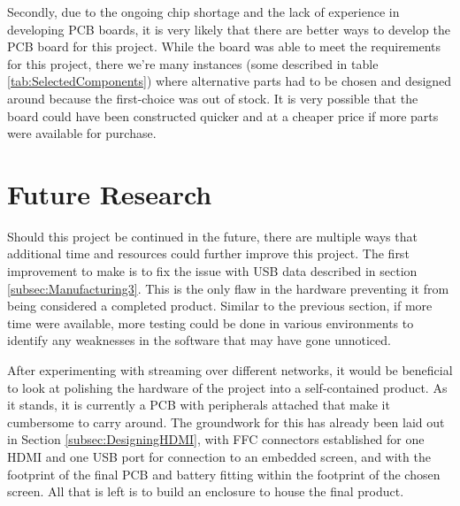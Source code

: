 Secondly, due to the ongoing chip shortage and the lack of experience in developing PCB boards, it is very likely that there are better ways to develop the PCB board for this project.
While the board was able to meet the requirements for this project, there we're many instances (some described in table \ref{tab:SelectedComponents}) where alternative parts had to be chosen and designed around because the first-choice was out of stock.
It is very possible that the board could have been constructed quicker and at a cheaper price if more parts were available for purchase.


\section{Future Research}\label{sec:ConclusionFutureResearch}

Should this project be continued in the future, there are multiple ways that additional time and resources could further improve this project.
The first improvement to make is to fix the issue with USB data described in section \ref{subsec:Manufacturing3}.
This is the only flaw in the hardware preventing it from being considered a completed product.
Similar to the previous section, if more time were available, more testing could be done in various environments to identify any weaknesses in the software that may have gone unnoticed.

After experimenting with streaming over different networks, it would be beneficial to look at polishing the hardware of the project into a self-contained product.
As it stands, it is currently a PCB with peripherals attached that make it cumbersome to carry around.
The groundwork for this has already been laid out in Section \ref{subsec:DesigningHDMI}, with FFC connectors established for one HDMI and one USB port for connection to an embedded screen, and with the footprint of the final PCB and battery fitting within the footprint of the chosen screen.
All that is left is to build an enclosure to house the final product.